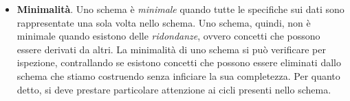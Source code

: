 \documentclass[12pt]{report}
\begin{document}
\begin{itemize}
\begin{itemize}
 			\item disporre i costrutti su una griglia scegliendo come elementi centrali quelli con più relazioni con altri;
 			\item tracciare solo linee perpendicolari e cercare di minimizzare le interesezioni;
 			\item disporre le entità che sono genitori di generalizzazioni sopra le relative entità figlie.
 		\end{itemize}
 		\item \textbf{Minimalità}. Uno schema è \textit{minimale} quando tutte le specifiche sui dati sono rappresentate una sola volta nello schema. Uno schema, quindi, non è minimale quando esistono delle \textit{ridondanze}, ovvero concetti che possono essere derivati da altri. La minimalità di uno schema si può verificare per ispezione, contrallando se esistono concetti che possono essere eliminati dallo schema che stiamo costruendo senza inficiare la sua completezza. Per quanto detto, si deve prestare particolare attenzione ai cicli presenti nello schema.
 	\end{itemize}
\end{document}
